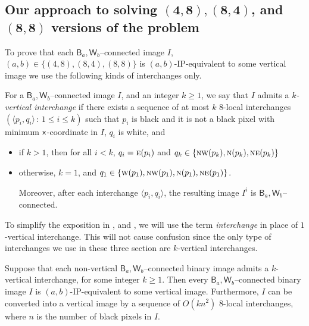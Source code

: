 \documentclass[lotsofwhite,charterfonts]{patmorin}
\newcommand{\N}{\textsc{n}}
\newcommand{\NE}{\textsc{ne}}
\newcommand{\E}{\textsc{e}}
\newcommand{\W}{\textsc{w}}
\newcommand{\NW}{\textsc{nw}}
\newcommand{\x}{\ensuremath{\protect\textup{\textsf{x}}}}
\newcommand{\ic}[2]{\langle #1,#2 \rangle}
\begin{document}
\subsection{Our approach to solving $\mathbf{(4,8), (8,4)}$, and
$\mathbf{(8,8)}$ versions of the problem}

To prove that each $\textsf{B}_a,\textsf{W}_b$--connected image $I$,
$(a,b)\in \{(4,8), (8,4), (8,8)\}$ is $(a,b)$-IP-equivalent to some
vertical image we use the following kinds of interchanges only.

For a $\textsf{B}_a,\textsf{W}_b$--connected image $I$, and an integer
$k\geq 1$, we say that $I$ admits a \emph{$k$-vertical interchange} if
there exists a sequence of at most $k$ $8$-local interchanges
$(\ic{p_i}{q_i}\, :\, 1\leq i\leq k)$ such that $p_i$ is black and it
is not a black pixel  with minimum \x-coordinate in $I$, $q_i$ is
white, and 

\begin{itemize} 

\item if $k>1$, then for all $i<k$, $q_i=\E(p_i)$ and
$q_k\in\{\NW(p_k),\N(p_k),\NE(p_k)\}$ 

\item otherwise, $k=1$, and
$q_1\in\{\W(p_1),\NW(p_1),\N(p_1),\NE(p_1)\}$.

Moreover, after each interchange $\ic{p_i}{q_i}$, the resulting
image $I^i$ is $\textsf{B}_a,\textsf{W}_b$--connected. 
\end{itemize}

To simplify the exposition in , 
and , we will use the term \emph{interchange} in
place of $1$-vertical interchange. This will not cause confusion since
the only type of interchanges we use in these three section are
$k$-vertical interchanges.

\begin{lem} 
Suppose that each non-vertical $\textsf{B}_a,\textsf{W}_b$--connected
binary image admits a $k$-vertical interchange, for some integer
$k\geq 1$. Then every $\textsf{B}_a,\textsf{W}_b$--connected binary
image $I$ is $(a,b)$-IP-equivalent to some vertical image.
Furthermore, $I$ can be converted into a vertical image by a sequence
of $O(kn^2)$ 8-local interchanges, where $n$ is the number of black
pixels in $I$.
\end{lem}
\end{document}
